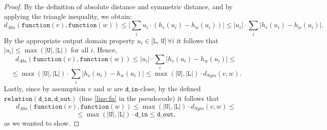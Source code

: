 \documentclass[11pt,a4paper]{article}
\theoremstyle{definition}
\newcommand{\din}{\texttt{d\_in}}
\newcommand{\dout}{\texttt{d\_out}}
\newcommand{\Relation}{\texttt{relation}}
\newcommand{\function}{\texttt{function}}
\newcommand{\silvia}[1]{{ {\color{blue}{(silvia)~#1}}}}
\begin{document}
\begin{proof}
\silvia{Might be easier to just state this in terms of absolute clamp and refer to that transformation proof.}

By the definition of absolute distance and symmetric distance, and by applying the triangle inequality, we obtain:
\[
    d_{Abs}(\function(v), \function(w)) \leq \Big|\sum_i u_i \cdot (h_v(u_i) - h_w(u_i))\Big| \leq |u_i| \cdot \sum_i |h_v(u_i) - h_w(u_i)|.
\]
By the appropriate output domain property $u_i \in \texttt{[L, U]} \, \forall i$ it follows that $|u_i| \leq \max{(|\texttt{U}|, |\texttt{L}|)}$ for all $i$. Hence,
\[
    d_{Abs}(\function(v), \function(w)) \leq |u_i| \cdot \sum_i |h_v(u_i) - h_w(u_i)| \leq 
\]
\[
    \leq \max{(|\texttt{U}|, |\texttt{L}|)} \cdot \sum_i |h_v(u_i) - h_w(u_i)| \leq \max{(|\texttt{U}|, |\texttt{L}|)} \cdot d_{Sym}(v, w).
\]
Lastly, since by assumption $v$ and $w$ are $\din$-close, by the defined $\Relation(\din, \dout)$ (line \ref{line:fn} in the pseudocode) it follows that
\[
    d_{Abs}(\function(v), \function(w)) \leq \max{(|\texttt{U}|, |\texttt{L}|)} \cdot d_{Sym}(v, w) \leq 
\]
\[
    \leq \max{(|\texttt{U}|, |\texttt{L}|)} \cdot \din \leq \dout,
\]
as we wanted to show.
\end{proof}

\silvia{Flag: need to account for rounding errors in the stability relation given the non-closure of float addition, as discussed on the week of August 2nd. We are figuring this out.}
\end{document}
